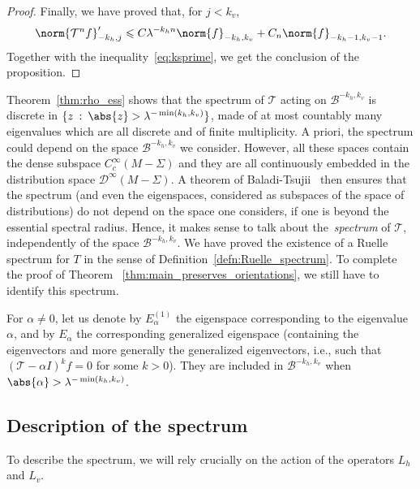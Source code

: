\documentclass[11pt, a4paper, oneside, final, pagebackref]{amsart}
\newcommand{\boB}{\mathcal{B}}
\newcommand{\boD}{\mathcal{D}}
\newcommand{\boT}{\mathcal{T}}
\newcommand{\st}{\::\:}
\renewcommand{\leq}{\leqslant}
\theoremstyle{definition}
\numberwithin{equation}{section}
\begin{document}
\begin{proof}
Finally, we have proved that, for $j < k_v$,
\begin{equation*}
  \norm{\boT^n f}'_{-k_h, j} \leq C \lambda^{-k_h n} \norm{f}_{-k_h, k_v} + C_n \norm{f}_{-k_h-1, k_v-1}.
\end{equation*}
Together with the inequality~\eqref{eq:ksprime}, we get the conclusion of the
proposition.
\end{proof}




Theorem~\ref{thm:rho_ess} shows that the spectrum of $\boT$ acting on
$\boB^{-k_h, k_v}$ is discrete in $\{z \st \abs{z} > \lambda^{-\min(k_h,
k_v)}\}$, made of at most countably many eigenvalues which are all discrete
and of finite multiplicity. A priori, the spectrum could depend on the space
$\boB^{-k_h, k_v}$ we consider. However, all these spaces contain the dense
subspace $C^\infty_c(M-\Sigma)$ and they are all continuously embedded in the
distribution space $\boD^\infty(M-\Sigma)$. A theorem of
Baladi-Tsujii~\cite[Lemma~A.1]{bt_zeta} then  ensures that the spectrum (and
even the eigenspaces, considered as subspaces of the space of distributions)
do not depend on the space one considers, if one is beyond the essential
spectral radius. Hence, it makes sense to talk about the~\emph{spectrum} of
$\boT$, independently of the space $\boB^{-k_h, k_v}$. We have proved the
existence of a Ruelle spectrum for $T$ in the sense of
Definition~\ref{defn:Ruelle_spectrum}. To complete the proof of Theorem
~\ref{thm:main_preserves_orientations}, we still have to identify this
spectrum.

For $\alpha \neq 0$, let us denote by $E_\alpha^{(1)}$ the eigenspace
corresponding to the eigenvalue $\alpha$, and by $E_\alpha$ the corresponding
generalized eigenspace (containing the eigenvectors and more generally the
generalized eigenvectors, i.e., such that $(\boT -\alpha I)^k f = 0$ for some
$k > 0$). They are included in $\boB^{-k_h, k_v}$ when $\abs{\alpha}
> \lambda^{-\min(k_h, k_v)}$.


\subsection{Description of the spectrum}

To describe the spectrum, we will rely crucially on the action of the
operators $L_h$ and $L_v$.
\end{document}

